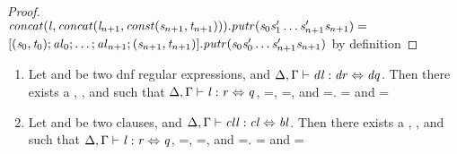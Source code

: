 \begin{lemma}
\begin{proof}
\\
$\mathit{concat}(\mathit{l},\mathit{concat}(\mathit{l}_{n+1},\mathit{const}(\mathit{s}_{n+1},\mathit{t}_{n+1})))\mathit{.putr}
(\mathit{s}_0\mathit{s}_1'\ldots\mathit{s}_{n+1}'\mathit{s}_{n+1}) =$\\
$[(\mathit{s}_0,\mathit{t}_0);\mathit{al}_0;\ldots;\mathit{al}_{n+1};(\mathit{s}_{n+1},\mathit{t}_{n+1})]\mathit{.putr}(\mathit{s}_0\mathit{s}_0'\ldots\mathit{s}_{n+1}'\mathit{s}_{n+1})$ by definition
\end{proof}
\end{lemma}

\begin{lemma}\leavevmode
\begin{enumerate}
\item Let \DNFRegex{} and \DNFRegexAlt{} be two dnf regular expressions, and $\Delta, \Gamma \vdash \mathit{dl} : \mathit{dr} \Leftrightarrow \mathit{dq}$.  Then there exists a \Lens{}, \Regex{}, and \RegexAlt{} such that $\Delta, \Gamma \vdash \mathit{l} : \mathit{r} \Leftrightarrow \mathit{q}$, \PutRight{\Lens}=\PutRight{\DNFLens}, \LanguageOf{\Delta}{\Regex}=\LanguageOf{\Delta}{\DNFRegex}, and \LanguageOf{\Delta}{\RegexAlt}=\LanguageOf{\Delta}{\DNFRegexAlt}.  \LanguageOf{\Delta{}}{\Regex{}} = \LanguageOf{\Delta{}}{\DNFRegex{}} and
\LanguageOf{\Delta{}}{\RegexAlt{}} = \LanguageOf{\Delta{}}{\DNFRegexAlt{}}

\item Let \Clause{} and \ClauseAlt{} be two clauses, and $\Delta, \Gamma \vdash \mathit{cll} : \mathit{cl} \Leftrightarrow \mathit{bl}$.  Then there exists a \Lens{}, \Regex{}, and \RegexAlt{} such that $\Delta, \Gamma \vdash \mathit{l} : \mathit{r} \Leftrightarrow \mathit{q}$, \PutRight{\Lens}=\PutRight{\ClauseLens}, \LanguageOf{\Delta}{\Regex}=\LanguageOf{\Delta}{\Clause}, and \LanguageOf{\Delta}{\RegexAlt}=\LanguageOf{\Delta}{\ClauseAlt}.  \LanguageOf{\Delta{}}{\Regex{}} = \LanguageOf{\Delta{}}{\Clause{}} and
\LanguageOf{\Delta{}}{\RegexAlt{}} = \LanguageOf{\Delta{}}{\ClauseAlt{}}


\end{enumerate}
\end{lemma}
